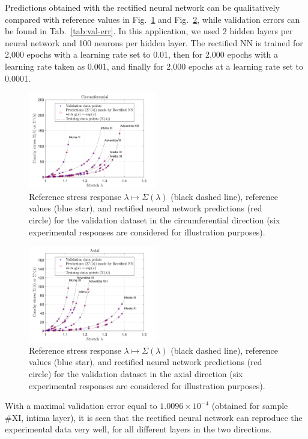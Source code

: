 Predictions obtained with the rectified neural network can be qualitatively compared with reference values in Fig.~\ref{fig:exp_circ} and Fig.~\ref{fig:exp_axial}, while validation errors can be found in Tab.~\ref{tab:val-err}. In this application, we used 2 hidden layers per neural network and 100 neurons per hidden layer. The rectified NN is trained for 2,000 epochs with a learning rate set to 0.01, then for 2,000 epochs with a learning rate taken as 0.001, and finally for 2,000 epochs at a learning rate set to 0.0001. 
\begin{figure}[ht!]
    \begin{center}
        \includegraphics[width=0.5\textwidth]{Pictures/circ.png}
    \end{center}
    \caption[Reference stress response and values, RNN predictions (circumferential).]{Reference stress response $\lambda \mapsto \Sigma(\lambda)$ (black dashed line), reference values (blue star), and rectified neural network predictions (red circle) for the validation dataset in the circumferential direction (six experimental responses are considered for illustration purposes).}
    \label{fig:exp_circ}
\end{figure}
\begin{figure}[ht!]
    \begin{center}
        \includegraphics[width=0.5\textwidth]{Pictures/axial.png}
    \end{center}
    \caption[Reference stress response and reference values, RNN predictions (axial).]{Reference stress response $\lambda \mapsto \Sigma(\lambda)$ (black dashed line), reference values (blue star), and rectified neural network predictions (red circle) for the validation dataset in the axial direction (six experimental responses are considered for illustration purposes).}
    \label{fig:exp_axial}
\end{figure}
With a maximal validation error equal to $1.0096\times10^{-4}$ (obtained for sample \#XI, intima layer), it is seen that the rectified neural network can reproduce the experimental data very well, for all different layers in the two directions.

